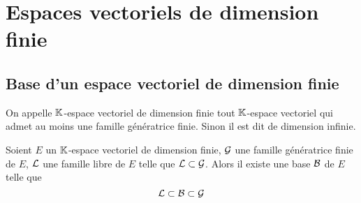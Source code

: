 \section{Espaces vectoriels de dimension finie}

\subsection{Base d'un espace vectoriel de dimension finie}

\begin{defdef}
  On appelle \(\mathbb{K}\)-espace vectoriel de dimension finie tout \(\mathbb{K}\)-espace vectoriel qui admet au moins une famille génératrice finie. Sinon il est dit de dimension infinie.
\end{defdef}

\begin{theo}
  Soient \(E\) un \(\mathbb{K}\)-espace vectoriel de dimension finie, \(\mathcal{G}\) une famille génératrice finie de \(E\), \(\mathcal{L}\) une famille libre de \(E\) telle que \(\mathcal{L} \subset \mathcal{G}\). Alors il existe une base \(\mathcal{B}\) de \(E\) telle que
  \begin{equation}
    \mathcal{L} \subset \mathcal{B} \subset \mathcal{G}
  \end{equation}
\end{theo}
